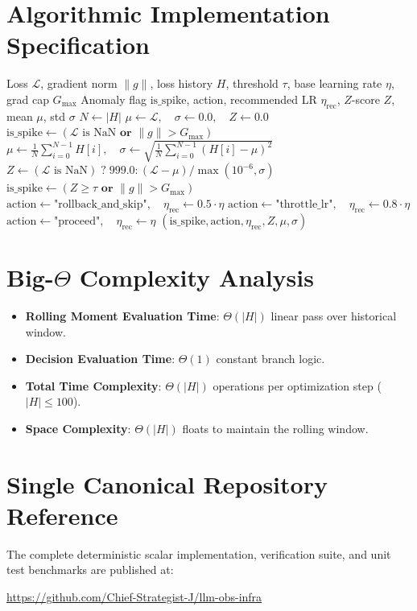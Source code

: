 \documentclass[11pt,a4paper]{article}
\theoremstyle{definition}
\begin{document}
\section{Algorithmic Implementation Specification}

\begin{algorithm}[H]
\caption{Loss Spike Anomaly Watchdog and Adaptive Action Controller}
\begin{algorithmic}[1]
\Require Loss $\mathcal{L}$, gradient norm $\|g\|$, loss history $H$, threshold $\tau$, base learning rate $\eta$, grad cap $G_{\max}$
\Ensure Anomaly flag $\text{is\_spike}$, action, recommended LR $\eta_{\text{rec}}$, $Z$-score $Z$, mean $\mu$, std $\sigma$
\State $N \gets |H|$
    \State $\mu \gets \mathcal{L}, \quad \sigma \gets 0.0, \quad Z \gets 0.0$
    \State $\text{is\_spike} \gets (\mathcal{L} \text{ is NaN} \textbf{ or } \|g\| > G_{\max})$
\Else
    \State $\mu \gets \frac{1}{N} \sum_{i=0}^{N-1} H[i], \quad \sigma \gets \sqrt{\frac{1}{N} \sum_{i=0}^{N-1} (H[i] - \mu)^2}$
    \State $Z \gets (\mathcal{L} \text{ is NaN}) \; ? \; 999.0 : (\mathcal{L} - \mu) / \max(10^{-6}, \sigma)$
    \State $\text{is\_spike} \gets (Z \ge \tau \textbf{ or } \|g\| > G_{\max})$
\EndIf
{}
        \State $\text{action} \gets \text{"rollback\_and\_skip"}, \quad \eta_{\text{rec}} \gets 0.5 \cdot \eta$
    \Else
        \State $\text{action} \gets \text{"throttle\_lr"}, \quad \eta_{\text{rec}} \gets 0.8 \cdot \eta$
    \EndIf
\Else
    \State $\text{action} \gets \text{"proceed"}, \quad \eta_{\text{rec}} \gets \eta$
\EndIf
\State \Return $(\text{is\_spike}, \text{action}, \eta_{\text{rec}}, Z, \mu, \sigma)$
\end{algorithmic}
\end{algorithm}

\section{Big-$\Theta$ Complexity Analysis}

\begin{itemize}
    \item \textbf{Rolling Moment Evaluation Time}: $\Theta(|H|)$ linear pass over historical window.
    \item \textbf{Decision Evaluation Time}: $\Theta(1)$ constant branch logic.
    \item \textbf{Total Time Complexity}: $\Theta(|H|)$ operations per optimization step ($|H| \le 100$).
    \item \textbf{Space Complexity}: $\Theta(|H|)$ floats to maintain the rolling window.
\end{itemize}

\section{Single Canonical Repository Reference}

The complete deterministic scalar implementation, verification suite, and unit test benchmarks are published at:
\begin{center}
\url{https://github.com/Chief-Strategist-J/llm-obs-infra}
\end{center}
\end{document}

